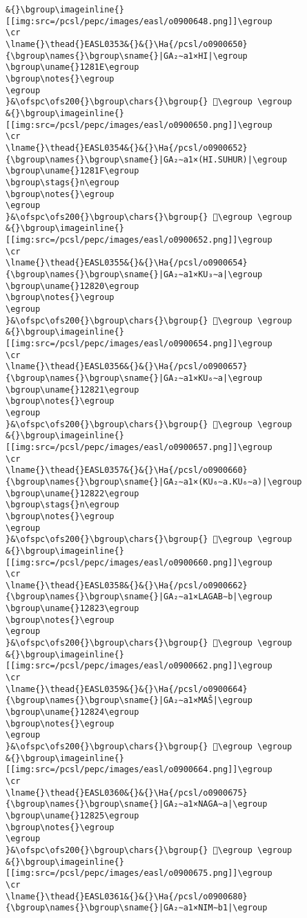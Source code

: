 \begin{verbatim}
&{}\bgroup\imageinline{}[[img:src=/pcsl/pepc/images/easl/o0900648.png]]\egroup
\cr
\lname{}\thead{}EASL0353&{}&{}\Ha{/pcsl/o0900650}{\bgroup\names{}\bgroup\sname{}|GA₂∼a1×HI|\egroup
\bgroup\uname{}1281E\egroup
\bgroup\notes{}\egroup
\egroup
}&\ofspc\ofs200{}\bgroup\chars{}\bgroup{} 𒠞\egroup \egroup
&{}\bgroup\imageinline{}[[img:src=/pcsl/pepc/images/easl/o0900650.png]]\egroup
\cr
\lname{}\thead{}EASL0354&{}&{}\Ha{/pcsl/o0900652}{\bgroup\names{}\bgroup\sname{}|GA₂∼a1×(HI.SUHUR)|\egroup
\bgroup\uname{}1281F\egroup
\bgroup\stags{}n\egroup
\bgroup\notes{}\egroup
\egroup
}&\ofspc\ofs200{}\bgroup\chars{}\bgroup{} 𒠟\egroup \egroup
&{}\bgroup\imageinline{}[[img:src=/pcsl/pepc/images/easl/o0900652.png]]\egroup
\cr
\lname{}\thead{}EASL0355&{}&{}\Ha{/pcsl/o0900654}{\bgroup\names{}\bgroup\sname{}|GA₂∼a1×KU₃∼a|\egroup
\bgroup\uname{}12820\egroup
\bgroup\notes{}\egroup
\egroup
}&\ofspc\ofs200{}\bgroup\chars{}\bgroup{} 𒠠\egroup \egroup
&{}\bgroup\imageinline{}[[img:src=/pcsl/pepc/images/easl/o0900654.png]]\egroup
\cr
\lname{}\thead{}EASL0356&{}&{}\Ha{/pcsl/o0900657}{\bgroup\names{}\bgroup\sname{}|GA₂∼a1×KU₆∼a|\egroup
\bgroup\uname{}12821\egroup
\bgroup\notes{}\egroup
\egroup
}&\ofspc\ofs200{}\bgroup\chars{}\bgroup{} 𒠡\egroup \egroup
&{}\bgroup\imageinline{}[[img:src=/pcsl/pepc/images/easl/o0900657.png]]\egroup
\cr
\lname{}\thead{}EASL0357&{}&{}\Ha{/pcsl/o0900660}{\bgroup\names{}\bgroup\sname{}|GA₂∼a1×(KU₆∼a.KU₆∼a)|\egroup
\bgroup\uname{}12822\egroup
\bgroup\stags{}n\egroup
\bgroup\notes{}\egroup
\egroup
}&\ofspc\ofs200{}\bgroup\chars{}\bgroup{} 𒠢\egroup \egroup
&{}\bgroup\imageinline{}[[img:src=/pcsl/pepc/images/easl/o0900660.png]]\egroup
\cr
\lname{}\thead{}EASL0358&{}&{}\Ha{/pcsl/o0900662}{\bgroup\names{}\bgroup\sname{}|GA₂∼a1×LAGAB∼b|\egroup
\bgroup\uname{}12823\egroup
\bgroup\notes{}\egroup
\egroup
}&\ofspc\ofs200{}\bgroup\chars{}\bgroup{} 𒠣\egroup \egroup
&{}\bgroup\imageinline{}[[img:src=/pcsl/pepc/images/easl/o0900662.png]]\egroup
\cr
\lname{}\thead{}EASL0359&{}&{}\Ha{/pcsl/o0900664}{\bgroup\names{}\bgroup\sname{}|GA₂∼a1×MAŠ|\egroup
\bgroup\uname{}12824\egroup
\bgroup\notes{}\egroup
\egroup
}&\ofspc\ofs200{}\bgroup\chars{}\bgroup{} 𒠤\egroup \egroup
&{}\bgroup\imageinline{}[[img:src=/pcsl/pepc/images/easl/o0900664.png]]\egroup
\cr
\lname{}\thead{}EASL0360&{}&{}\Ha{/pcsl/o0900675}{\bgroup\names{}\bgroup\sname{}|GA₂∼a1×NAGA∼a|\egroup
\bgroup\uname{}12825\egroup
\bgroup\notes{}\egroup
\egroup
}&\ofspc\ofs200{}\bgroup\chars{}\bgroup{} 𒠥\egroup \egroup
&{}\bgroup\imageinline{}[[img:src=/pcsl/pepc/images/easl/o0900675.png]]\egroup
\cr
\lname{}\thead{}EASL0361&{}&{}\Ha{/pcsl/o0900680}{\bgroup\names{}\bgroup\sname{}|GA₂∼a1×NIM∼b1|\egroup

\end{verbatim}
